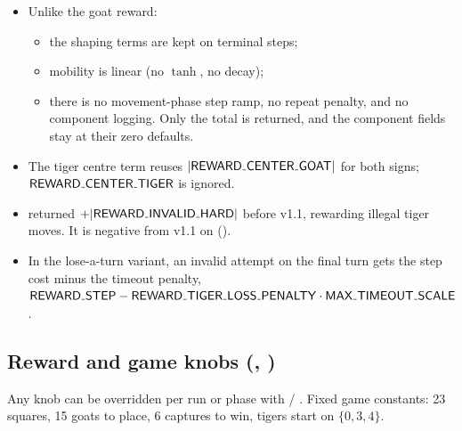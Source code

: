 \begin{itemize}
\item Unlike the goat reward:
\begin{itemize}
\item the shaping terms are kept on terminal steps;
\item mobility is linear (no $\tanh$, no decay);
\item there is no movement-phase step ramp, no repeat penalty, and no  component logging. Only the total is returned, and the component fields stay at their zero defaults.
\end{itemize}
\item The tiger centre term reuses $\lvert\knob{REWARD\_CENTER\_GOAT}\rvert$ for both signs; $\knob{REWARD\_CENTER\_TIGER}$ is ignored.
\item {} returned $+\lvert\knob{REWARD\_INVALID\_HARD}\rvert$ before v1.1, rewarding illegal tiger moves. It is negative from v1.1 on ().
\item In the lose-a-turn variant, an invalid attempt on the final turn gets the step cost minus the timeout penalty, $\knob{REWARD\_STEP} - \knob{REWARD\_TIGER\_LOSS\_PENALTY}\cdot\knob{MAX\_TIMEOUT\_SCALE}$.
\end{itemize}
\subsection{Reward and game knobs (, )}\label{old:2.7}

Any knob can be overridden per run or phase with  / . Fixed game constants: 23 squares, 15 goats to place, 6 captures to win, tigers start on $\{0, 3, 4\}$.


